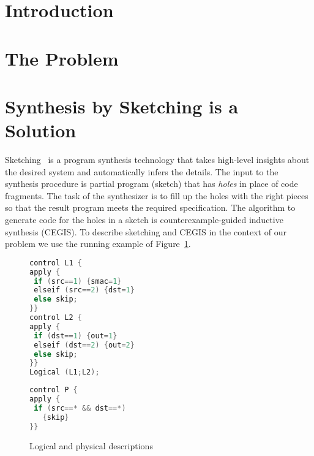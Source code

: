 \section{Introduction}


\section{The Problem}

\section{Synthesis by Sketching is a Solution}


Sketching~\cite{armando-thesis,armando2013sketch} is a program synthesis technology that 
takes high-level insights about the desired system and automatically infers the details.
The input to the synthesis procedure is partial program (sketch) that has {\em holes}
in place of code fragments.
The task of the synthesizer is to fill up the holes with the right pieces so that the 
result program meets the required specification.  
The algorithm to generate code for the holes in a sketch is counterexample-guided inductive synthesis (CEGIS).
To describe sketching and CEGIS in the context of our problem we use the running 
example of Figure~\ref{fig:table-wp}.

\begin{figure}[h]
\centering
\begin{minipage}[t]{.23\textwidth}
\centering
\begin{framed}
\begin{lstlisting}[basicstyle=\ttfamily\footnotesize,language=C, lineskip = 0em,numbersep=0pt,resetmargins=true, xleftmargin=-1em]
control L1 {
apply {
 if (src==1) {smac=1} 
 elseif (src==2) {dst=1}
 else skip;
}}
control L2 {
apply {
 if (dst==1) {out=1} 
 elseif (dst==2) {out=2}
 else skip;
}}
Logical (L1;L2);
\end{lstlisting}
\end{framed}
\end{minipage}
\begin{minipage}[t]{.23\textwidth}
\centering
\begin{framed}
\begin{lstlisting}[basicstyle=\ttfamily\footnotesize,language=C, lineskip = 0em,numbersep=0pt,resetmargins=true, xleftmargin=-1em]
control P {
apply {
 if (src==* && dst==*)
   {skip} 
}}
\end{lstlisting}
\end{framed}
\end{minipage}

\label{fig:table-wp}
\caption{Logical and physical descriptions}
\end{figure}

